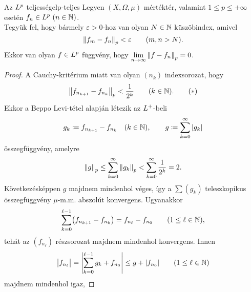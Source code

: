 \documentclass[
]{elteikthesis}[2024/04/26]
\begin{document}
	\begin{theorem}{Az \( \Lebesgue[p] \) teljessége}{lp-teljes}
		Legyen \( (X, \Omega, \mu) \) mértéktér, 
		valamint \( 1 \leq p \leq +\infty \) esetén \( f_n \in \Lebesgue[p] \ (n \in \N) \).\\[6pt]
		Tegyük fel, hogy bármely \( \varepsilon > 0 \)-hoz van olyan \( N \in \mathbb{N} \) küszöbindex, amivel
		\[
			\norm{f_m - f_n}_p < \varepsilon \qquad (m,n > N).
		\]
		Ekkor van olyan \( f \in \Lebesgue[p] \) függvény,
		hogy \( \lim\limits_{n \to \infty} \norm{f - f_n}_p = 0 \).
	\end{theorem}
	\begin{proof}
		A Cauchy-kritérium miatt van olyan \( (n_k) \) indexsorozat, hogy
		\begin{equation}\label{eq:lp-teljes-cauchy-becslés}
			\norm\big{ f_{n_{k + 1}} - f_{n_k} }_p < \frac{1}{2^k} 
			\qquad (k \in \mathbb{N}).
			\tag{\( * \)}
		\end{equation}
		Ekkor a Beppo Levi-tétel alapján létezik az \( L^+ \)-beli
		\[
			g_k \coloneq f_{n_{k + 1}} - f_{n_k} \quad (k \in \mathbb{N}), \qquad
			g \coloneq \sum_{k=0}^{\infty} \abs{ g_k }
		\]
		összegfüggvény, amelyre
		\[
			\norm{g}_p \leq
			\sum_{k=0}^{\infty} \norm{ g_k }_p <
			\sum_{k=0}^{\infty} \frac{1}{2^k} =
			2.
		\]
		Következésképpen \( g \) majdnem mindenhol véges, 
		így a \( \sum( g_k ) \) teleszkopikus összegfüggvény \( \mu \)-m.m. abszolút konvergens.
		Ugyanakkor
		\[
			\sum_{k=0}^{\ell - 1} \bigl( f_{n_{k + 1}} - f_{n_k} \bigr) =
			f_{n_\ell} - f_{n_0}
			\qquad (1 \leq \ell \in \mathbb{N}),
		\]
		tehát az \( (f_{n_\ell}) \) részsorozat majdnem mindenhol konvergens. Innen
		\[
			\abs\big{ f_{n_\ell} } =
			\abs\Bigg{ \sum_{k=0}^{\ell - 1} g_k + f_{n_0} } \leq g + \abs{ f_{n_0} }
			\qquad (1 \leq \ell \in \mathbb{N})
		\]
		majdnem mindenhol igaz,
		\marginnote{
}
\end{proof}
\end{document}
